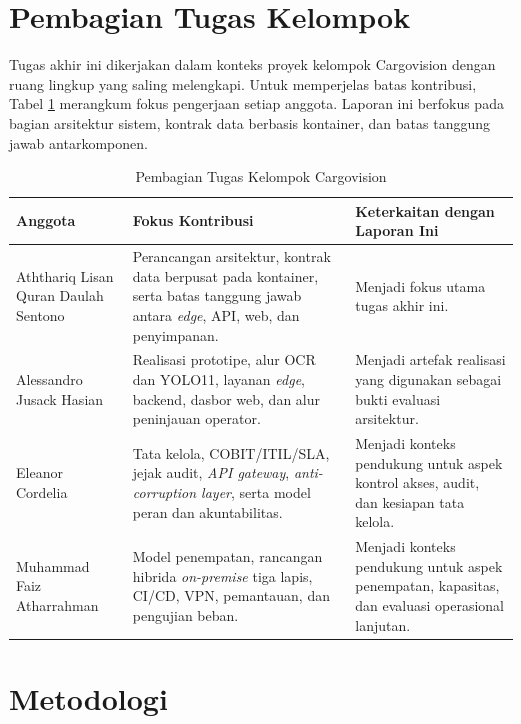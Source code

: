 \section{Pembagian Tugas Kelompok}

Tugas akhir ini dikerjakan dalam konteks proyek kelompok Cargovision dengan
ruang lingkup yang saling melengkapi. Untuk memperjelas batas kontribusi, Tabel
\ref{tbl:pembagian-tugas-kelompok} merangkum fokus pengerjaan setiap anggota.
Laporan ini berfokus pada bagian arsitektur sistem, kontrak data berbasis
kontainer, dan batas tanggung jawab antarkomponen.

\begin{table}[ht]
  \centering
  \small
  \caption[Pembagian tugas kelompok Cargovision]{Pembagian Tugas Kelompok Cargovision}
  \label{tbl:pembagian-tugas-kelompok}
  \setlength{\tabcolsep}{4pt}
  \renewcommand{\arraystretch}{1.12}
  \begin{tabularx}{\textwidth}{>{\raggedright\arraybackslash}p{} >{\raggedright\arraybackslash}X >{\raggedright\arraybackslash}p{}}
    \toprule
    \textbf{Anggota} & \textbf{Fokus Kontribusi} & \textbf{Keterkaitan dengan Laporan Ini} \\
    \midrule
    Aththariq Lisan Quran Daulah Sentono & Perancangan arsitektur, kontrak data berpusat pada kontainer, serta batas tanggung jawab antara \textit{edge}, API, web, dan penyimpanan. & Menjadi fokus utama tugas akhir ini. \\
    Alessandro Jusack Hasian & Realisasi prototipe, alur OCR dan YOLO11, layanan \textit{edge}, backend, dasbor web, dan alur peninjauan operator. & Menjadi artefak realisasi yang digunakan sebagai bukti evaluasi arsitektur. \\
    Eleanor Cordelia & Tata kelola, COBIT/ITIL/SLA, jejak audit, \textit{API gateway}, \textit{anti-corruption layer}, serta model peran dan akuntabilitas. & Menjadi konteks pendukung untuk aspek kontrol akses, audit, dan kesiapan tata kelola. \\
    Muhammad Faiz Atharrahman & Model penempatan, rancangan hibrida \textit{on-premise} tiga lapis, CI/CD, VPN, pemantauan, dan pengujian beban. & Menjadi konteks pendukung untuk aspek penempatan, kapasitas, dan evaluasi operasional lanjutan. \\
    \bottomrule
  \end{tabularx}
\end{table}

\FloatBarrier

\section{Metodologi}

